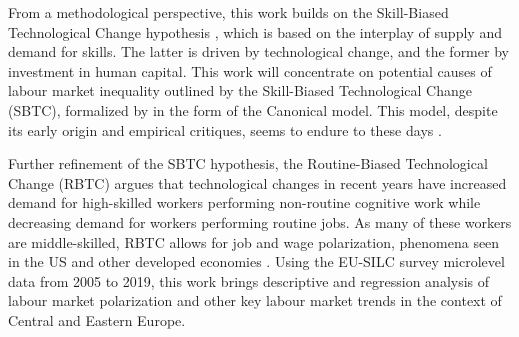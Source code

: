 \documentclass[11pt]{article}
\begin{document}



From a methodological perspective, this work builds on the Skill-Biased Technological Change hypothesis \citep{katz1992changes}, which is based on the interplay of supply and demand for skills. The latter is driven by technological change, and the former by investment in human capital. This work will concentrate on potential causes of labour market inequality outlined by the Skill-Biased Technological Change (SBTC), formalized by \cite{katz1992changes} in the form of the Canonical model. This model, despite its early origin \citep{katz1992changes} and empirical critiques, seems to endure to these days \citep{aziz2021between, goldin2020extending}.

Further refinement of the SBTC hypothesis, the Routine-Biased Technological Change (RBTC) argues that technological changes in recent years have increased demand for high-skilled workers performing non-routine cognitive work while decreasing demand for workers performing routine jobs. As many of these workers are middle-skilled, RBTC allows for job and wage polarization, phenomena seen in the US and other developed economies \citep{rodrik2020economic, temin2018vanishing}. Using the EU-SILC survey microlevel data from 2005 to 2019, this work brings descriptive and regression analysis of labour market polarization and other key labour market trends in the context of Central and Eastern Europe.


\end{document}
